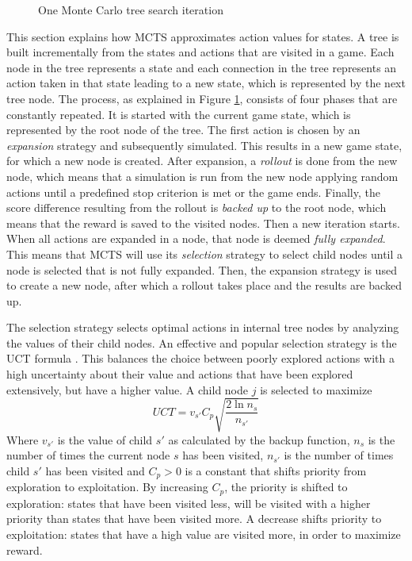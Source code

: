 \begin{figure}
	\centering
	\caption{One Monte Carlo tree search iteration}
	\label{fig:mcts}
\end{figure}

This section explains how MCTS approximates action values for states.  A tree is
built incrementally from the states and actions that are visited in a game. Each
node in the tree represents a state and each connection in the tree represents
an action taken in that state leading to a new state, which is represented by
the next tree node.  The process, as explained in Figure \ref{fig:mcts},
consists of four phases that are constantly repeated. It is started with the
current game state, which is represented by the root node of the tree. The first
action is chosen by an \emph{expansion} strategy and subsequently simulated.
This results in a new game state, for which a new node is created. After
expansion, a \emph{rollout} is done from the new node, which means that a
simulation is run from the new node applying random actions until a predefined
stop criterion is met or the game ends. Finally, the score difference resulting
from the rollout is \emph{backed up} to the root node, which means that the
reward is saved to the visited nodes.  Then a new iteration starts. When all
actions are expanded in a node, that node is deemed \emph{fully expanded}.
This means that MCTS will use its \emph{selection} strategy to select child
nodes until a node is selected that is not fully expanded.  Then, the expansion
strategy is used to create a new node, after which a rollout takes place and the
results are backed up.

The selection strategy selects optimal actions in internal tree nodes by
analyzing the values of their child nodes. An effective and popular selection
strategy is the UCT formula \cite{kocsis2006bandit}. This balances the choice
between poorly explored actions with a high uncertainty about their value and
actions that have been explored extensively, but have a higher value. A child
node $j$ is selected to maximize
\begin{equation}
	\label{eq:uct}
	UCT = v_{s'} C_p \sqrt{\frac{2 \ln n_s}{n_{s'}}}
\end{equation}
Where $v_{s'}$ is the value of child $s'$ as calculated by the backup function,
$n_s$ is the number of times the current node $s$ has been visited, $n_{s'}$ is
the number of times child $s'$ has been visited and $C_p > 0$ is a constant
that shifts priority from exploration to exploitation. By increasing $C_p$, the
priority is shifted to exploration: states that have been visited less, will be
visited with a higher priority than states that have been visited more. A
decrease shifts priority to exploitation: states that have a high value are
visited more, in order to maximize reward. 

